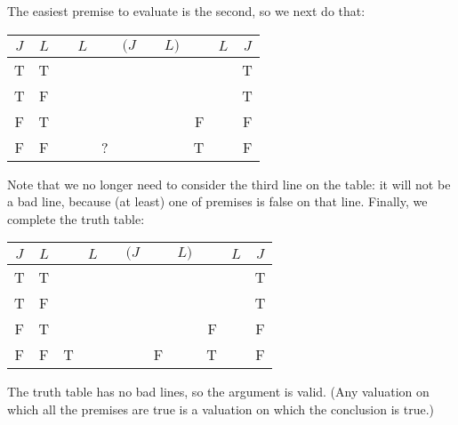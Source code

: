 The easiest premise to evaluate is the second, so we next do that:
\begin{center}
	\begin{tabular}{c c|d e e e e f |d f|c}
		$J$&$L$&\enot&$L$&\eif&$(J$&\eor&$L)$&\enot&$L$&$J$\\
		\hline
		T & T & &&&&&&&& {T}\\
		T & F & &&&&&&&& {T}\\
		F & T & &&&&&&{F}&& {F}\\
		F & F & &&?&&&&{T}&& {F}
	\end{tabular}
\end{center}
Note that we no longer need to consider the third line on the table: it will not be a bad line, because (at least) one of premises is false on that line. Finally, we complete the truth table:
\begin{center}
	\begin{tabular}{c c|d e e e e f |d f|c}
		$J$&$L$&\enot&$L$&\eif&$(J$&\eor&$L)$&\enot&$L$&$J$\\
		\hline
		T & T & &&&&&&&& {T}\\
		T & F & &&&&&&&& {T}\\
		F & T & &&&&&&{F}& & {F}\\
		F & F & T &  &  &  & F & & {T} & & {F}
	\end{tabular}
\end{center}
The truth table has no bad lines, so the argument is valid. (Any valuation on which all the premises are true is a valuation on which the conclusion is true.)

